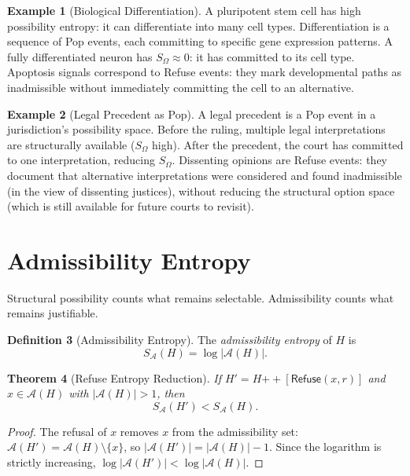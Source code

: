 \documentclass[12pt, a4paper, openany]{book}
\theoremstyle{plain}
\newtheorem{theorem}{Theorem}[chapter]
\theoremstyle{definition}
\newtheorem{definition}[theorem]{Definition}
\newtheorem{example}[theorem]{Example}
\theoremstyle{remark}
\newcommand{\Refuse}{\mathsf{Refuse}}
\newcommand{\calA}{\mathcal{A}}
\begin{document}
\begin{example}[Biological Differentiation]
A pluripotent stem cell has high possibility entropy: it can differentiate into
many cell types. Differentiation is a sequence of Pop events, each committing
to specific gene expression patterns. A fully differentiated neuron has
$S_\Omega \approx 0$: it has committed to its cell type. Apoptosis signals
correspond to Refuse events: they mark developmental paths as inadmissible
without immediately committing the cell to an alternative.
\end{example}

\begin{example}[Legal Precedent as Pop]
A legal precedent is a Pop event in a jurisdiction's possibility space. Before
the ruling, multiple legal interpretations are structurally available
($S_\Omega$ high). After the precedent, the court has committed to one
interpretation, reducing $S_\Omega$. Dissenting opinions are Refuse events:
they document that alternative interpretations were considered and found
inadmissible (in the view of dissenting justices), without reducing the
structural option space (which is still available for future courts to revisit).
\end{example}

\section{Admissibility Entropy}

Structural possibility counts what remains selectable. Admissibility counts
what remains justifiable.

\begin{definition}[Admissibility Entropy]
The \emph{admissibility entropy} of $H$ is
\[
S_{\calA}(H) = \log |\calA(H)|.
\]
\end{definition}

\begin{theorem}[Refuse Entropy Reduction]
If $H' = H \mathbin{++} [\Refuse(x,r)]$ and $x \in \calA(H)$ with $|\calA(H)| > 1$, then
\[
S_{\calA}(H') < S_{\calA}(H).
\]
\end{theorem}

\begin{proof}
The refusal of $x$ removes $x$ from the admissibility set:
$\calA(H') = \calA(H) \setminus \{x\}$, so $|\calA(H')| = |\calA(H)| - 1$.
Since the logarithm is strictly increasing, $\log|\calA(H')| < \log|\calA(H)|$.
\end{proof}
\end{document}
